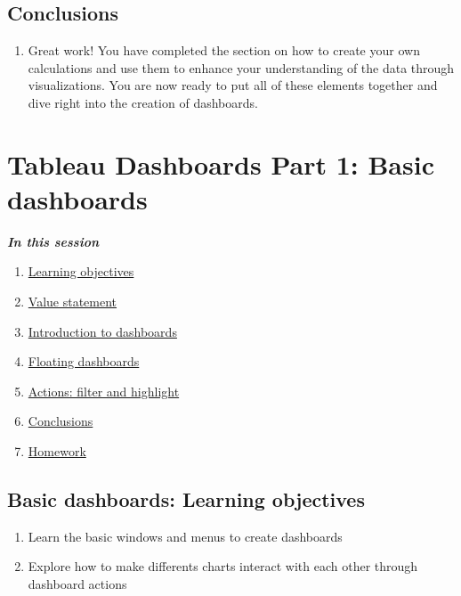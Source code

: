 \documentclass[
]{book}
\providecommand{\tightlist}{%
  \setlength{\itemsep}{0pt}\setlength{\parskip}{0pt}}
\begin{document}
\hypertarget{conclusions-1}{%
\subsection{Conclusions}\label{conclusions-1}}

\begin{enumerate}
\def\labelenumi{\arabic{enumi}.}
\tightlist
\item
  Great work! You have completed the section on how to create your own calculations and use them to enhance your understanding of the data through visualizations. You are now ready to put all of these elements together and dive right into the creation of dashboards.
\end{enumerate}

\hypertarget{tableau-dashboards-part-1-basic-dashboards}{%
\section{Tableau Dashboards Part 1: Basic dashboards}\label{tableau-dashboards-part-1-basic-dashboards}}

\textbf{\emph{In this session}}

\begin{enumerate}
\def\labelenumi{\arabic{enumi}.}
\tightlist
\item
  \protect\hyperlink{basic-dashboards-learning-objetives}{Learning objectives}
\item
  \protect\hyperlink{basic-dashboards-value-statement}{Value statement}
\item
  \protect\hyperlink{introduction-to-dashboards}{Introduction to dashboards}
\item
  \protect\hyperlink{floating-dashboards}{Floating dashboards}
\item
  \protect\hyperlink{actions-filter-and-highlight}{Actions: filter and highlight}
\item
  \protect\hyperlink{conclusions}{Conclusions}
\item
  \protect\hyperlink{homework}{Homework}
\end{enumerate}

\hypertarget{basic-dashboards-learning-objectives}{%
\subsection{Basic dashboards: Learning objectives}\label{basic-dashboards-learning-objectives}}

\begin{enumerate}
\def\labelenumi{\arabic{enumi}.}
\tightlist
\item
  Learn the basic windows and menus to create dashboards
\item
  Explore how to make differents charts interact with each other through dashboard actions
\end{enumerate}
\end{document}
